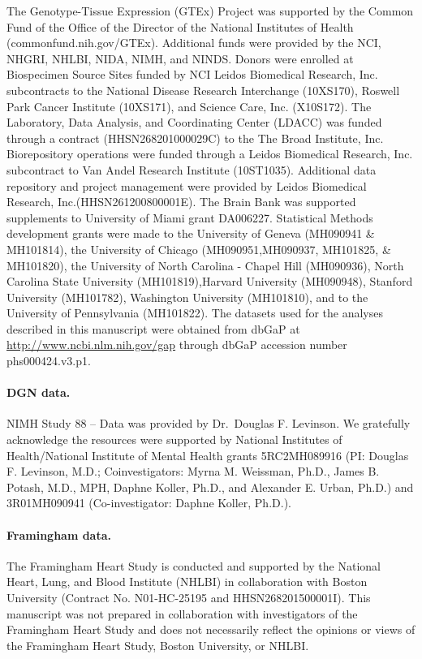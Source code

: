 \documentclass[10pt,letterpaper]{article}
\begin{document}
The Genotype-Tissue Expression (GTEx) Project was supported by the
Common Fund of the Office of the Director of the National Institutes of
Health (commonfund.nih.gov/GTEx). Additional funds were provided by the
NCI, NHGRI, NHLBI, NIDA, NIMH, and NINDS. Donors were enrolled at
Biospecimen Source Sites funded by NCI Leidos Biomedical Research, Inc.
subcontracts to the National Disease Research Interchange (10XS170),
Roswell Park Cancer Institute (10XS171), and Science Care, Inc.
(X10S172). The Laboratory, Data Analysis, and Coordinating Center
(LDACC) was funded through a contract (HHSN268201000029C) to the The
Broad Institute, Inc. Biorepository operations were funded through a
Leidos Biomedical Research, Inc. subcontract to Van Andel Research
Institute (10ST1035). Additional data repository and project management
were provided by Leidos Biomedical Research, Inc.(HHSN261200800001E).
The Brain Bank was supported supplements to University of Miami grant
DA006227. Statistical Methods development grants were made to the
University of Geneva (MH090941 \& MH101814), the University of Chicago
(MH090951,MH090937, MH101825, \& MH101820), the University of North
Carolina - Chapel Hill (MH090936), North Carolina State University
(MH101819),Harvard University (MH090948), Stanford University
(MH101782), Washington University (MH101810), and to the University of
Pennsylvania (MH101822). The datasets used for the analyses described in
this manuscript were obtained from dbGaP at
\url{http://www.ncbi.nlm.nih.gov/gap} through dbGaP accession number
phs000424.v3.p1.

\paragraph{DGN data.}\label{dgn-data}

NIMH Study 88 -- Data was provided by
Dr.~Douglas F. Levinson. We gratefully acknowledge the resources were
supported by National Institutes of Health/National Institute of Mental
Health grants 5RC2MH089916 (PI: Douglas F. Levinson, M.D.;
Coinvestigators: Myrna M. Weissman, Ph.D., James B. Potash, M.D., MPH,
Daphne Koller, Ph.D., and Alexander E. Urban, Ph.D.) and 3R01MH090941
(Co-investigator: Daphne Koller, Ph.D.).

\paragraph{Framingham data.}

The Framingham Heart Study is conducted and supported by the National Heart, Lung, and Blood Institute (NHLBI) in collaboration with Boston University (Contract No. N01-HC-25195 and HHSN268201500001I). This manuscript was not prepared in collaboration with investigators of the Framingham Heart Study and does not necessarily reflect the opinions or views of the Framingham Heart Study, Boston University, or NHLBI.
\end{document}
